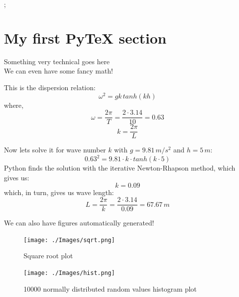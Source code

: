 \documentclass[12pt, letterpaper]{article}
\begin{document}
{ ;}
\cfoot{}
\pagebreak
\section{My first PyTeX section}
Something very technical goes here\\


We can even have some fancy math!

This is the dispersion relation:
$$\omega^2 = gk\, tanh(kh)$$
where,
$$\omega = \frac{2\pi}{T} = \frac{2\cdot 3.14}{10} = 0.63$$
$$k = \frac{2\pi}{L}$$

Now lets solve it for wave number $k$ with $g=9.81\, m/s^2$ and $h=5\, m$:
$$0.63^2=9.81\cdot k\cdot tanh(k\cdot 5)$$
Python finds the solution with the iterative Newton-Rhapson method, which gives us:
$$k = 0.09$$
which, in turn, gives us wave length:
$$L = \frac{2\pi}{k} = \frac{2\cdot 3.14}{0.09} = 67.67\, m$$

\pagebreak
We can also have figures automatically generated!
\begin{figure}[h]
	\centering
	\texttt{[image: ./Images/sqrt.png]}
	\caption{Square root plot}
\end{figure}

\begin{figure}[h]
	\centering
	\texttt{[image: ./Images/hist.png]}
	\caption{10000 normally distributed random values histogram plot}
\end{figure}
\end{document}
